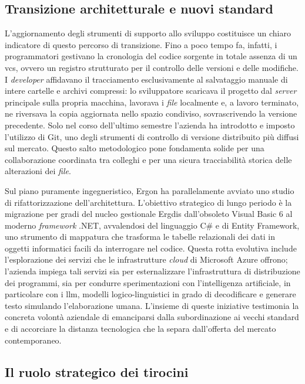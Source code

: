 \subsection{Transizione architetturale e nuovi standard}
\label{subsec:transizione_architetturale}

L'aggiornamento degli strumenti di supporto allo sviluppo costituisce un chiaro indicatore di questo percorso di transizione. Fino a poco tempo fa, infatti, i programmatori gestivano la cronologia del codice sorgente in totale assenza di un \gls{vcs}, ovvero un registro strutturato per il controllo delle versioni e delle modifiche. I \textit{developer} affidavano il tracciamento esclusivamente al salvataggio manuale di intere cartelle e archivi compressi: lo sviluppatore scaricava il progetto dal \textit{server} principale sulla propria macchina, lavorava i \textit{file} localmente e, a lavoro terminato, ne riversava la copia aggiornata nello spazio condiviso, sovrascrivendo la versione precedente. Solo nel corso dell'ultimo semestre l'azienda ha introdotto e imposto l'utilizzo di Git, uno degli strumenti di controllo di versione distribuito più diffusi sul mercato. Questo salto metodologico pone fondamenta solide per una collaborazione coordinata tra colleghi e per una sicura tracciabilità storica delle alterazioni dei \textit{file}.

Sul piano puramente ingegneristico, Ergon ha parallelamente avviato uno studio di rifattorizzazione dell'architettura. L'obiettivo strategico di lungo periodo è la migrazione per gradi del nucleo gestionale Ergdis dall'obsoleto Visual Basic 6 al moderno \textit{framework} .NET, avvalendosi del linguaggio C\# e di Entity Framework, uno strumento di mappatura che trasforma le tabelle relazionali dei dati in oggetti informatici facili da interrogare nel codice. Questa rotta evolutiva include l'esplorazione dei servizi che le infrastrutture \textit{cloud} di Microsoft Azure offrono; l'azienda impiega tali servizi sia per esternalizzare l'infrastruttura di distribuzione dei programmi, sia per condurre sperimentazioni con l'intelligenza artificiale, in particolare con i \gls{llm}, modelli logico-linguistici in grado di decodificare e generare testo simulando l'elaborazione umana. L'insieme di queste iniziative testimonia la concreta volontà aziendale di emanciparsi dalla subordinazione ai vecchi standard e di accorciare la distanza tecnologica che la separa dall'offerta del mercato contemporaneo.

\subsection{Il ruolo strategico dei tirocini}
\label{subsec:ruolo_tirocini}

